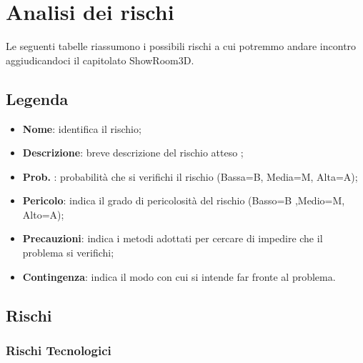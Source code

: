\section{Analisi dei rischi}
Le seguenti tabelle riassumono i possibili rischi a cui potremmo andare incontro aggiudicandoci il capitolato ShowRoom3D.
\subsection{Legenda}
\begin{itemize}
    \item \textbf{Nome}: identifica il rischio;
    \item \textbf{Descrizione}: breve descrizione del rischio atteso ;
    \item \textbf{Prob.} : probabilità che si verifichi il rischio (Bassa=B, Media=M, Alta=A);
    \item \textbf{Pericolo}: indica il grado di pericolosità del rischio (Basso=B ,Medio=M, Alto=A);
    \item \textbf{Precauzioni}: indica i metodi adottati per cercare di impedire che il problema si verifichi;
    \item \textbf{Contingenza}: indica il modo con cui si intende far fronte al problema.
\end{itemize}   

\subsection{Rischi}
\subsubsection{Rischi Tecnologici}

